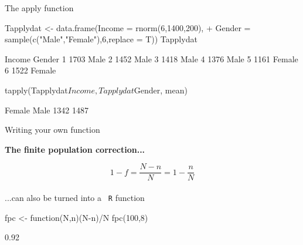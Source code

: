 \documentclass[11pt,german,hideothersubsections]{beamer}
\newcommand{\R}[1]{{\tt \color{blue}  #1}}
\begin{document}
\begin{frame}[fragile]{The apply function}
\footnotesize{
\begin{Schunk}
\begin{Sinput}
 Tapplydat <- data.frame(Income = rnorm(6,1400,200),
+                    Gender = sample(c("Male","Female"),6,replace = T))
 Tapplydat
\end{Sinput}
\begin{Soutput}
  Income Gender
1   1703   Male
2   1452   Male
3   1418   Male
4   1376   Male
5   1161 Female
6   1522 Female
\end{Soutput}
\begin{Sinput}
 tapply(Tapplydat$Income, Tapplydat$Gender, mean)
\end{Sinput}
\begin{Soutput}
Female   Male 
  1342   1487 
\end{Soutput}
\end{Schunk}
}
\end{frame}
\begin{frame}[fragile]{Writing your own function}
\begin{center}
\textbf{The finite population correction...}
\end{center}
\vspace{.25cm}
\begin{equation*}
1-f=\frac{N-n}{N}=1-\frac{n}{N}
\end{equation*}\\
\vspace{.5cm}
...can also be turned into a \R{R} function
\begin{Schunk}
\begin{Sinput}
 fpc <- function(N,n){(N-n)/N}
 fpc(100,8)
\end{Sinput}
\begin{Soutput}
[1] 0.92
\end{Soutput}
\end{Schunk}
\end{frame}
\end{document}
